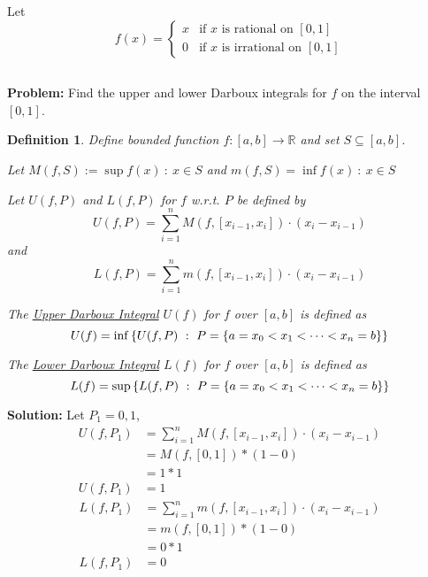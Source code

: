 \documentclass[]{article}
\newcommand{\R}{\mathbb{R}}
\newcommand{\st}{\ : \ }
\newtheorem{definition}{Definition}
\begin{document}





\newpage
\section{}
Let \[
    f(x) = \begin{cases}
        x & \text{if $x$ is rational on $[0,1]$}\\
        0 & \text{if $x$ is irrational on $[0,1]$}
    \end{cases}
\]

\subsection{}
\textbf{Problem:}
Find the upper and lower Darboux integrals for $f$ on the interval $[0,1]$.

\begin{definition}\label{def:darboux_int}
    Define bounded function $f : [a,b] \to \R$ and set $S \subseteq [a,b]$.

    Let $M(f,S) := \sup{f(x) \st x \in S}$ and $m(f,S) = \inf{f(x) \st x \in S}$

    Let $U(f,P)$ and $L(f,P)$ for $f$ w.r.t. $P$ be defined by\[
        U(f,P) = \sum_{i=1}^{n} M(f,[x_{i-1},x_i]) \cdot (x_i - x_{i-1})
    \] and \[
        L(f,P) = \sum_{i=1}^{n} m(f,[x_{i-1},x_i]) \cdot (x_i - x_{i-1})
    \]

    The \underline{\emph{Upper Darboux Integral}} $U(f)$ for $f$ over $[a,b]$ is defined as \[
        U(f) = \inf\qty{U(f,P) \st P = \{a = x_0 < x_1 < \cdots < x_n = b\}}
    \]

    The \underline{\emph{Lower Darboux Integral}} $L(f)$ for $f$ over $[a,b]$ is defined as \[
        L(f) = \sup\qty{L(f,P) \st P = \{a = x_0 < x_1 < \cdots < x_n = b\}}
    \]

\end{definition}

\textbf{Solution:}
Let $P_1 = {0,1}$,
\begin{align*}
    U(f,P_1) &= \sum_{i=1}^{n} M(f,[x_{i-1},x_i]) \cdot (x_i - x_{i-1})\\
        &= M(f,[0,1]) * (1 - 0)\\
        &= 1 * 1\\
    U(f,P_1) &= 1
\end{align*}
\begin{align*}
    L(f,P_1) &= \sum_{i=1}^{n} m(f,[x_{i-1},x_i]) \cdot (x_i - x_{i-1})\\
        &= m(f,[0,1]) * (1 - 0)\\
        &= 0 * 1\\
    L(f,P_1) &= 0
\end{align*}
\end{document}
